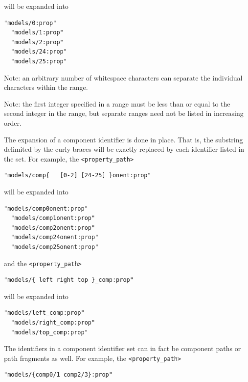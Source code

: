 \documentclass{article}
\begin{document}
will be expanded into

\begin{lstlisting}[]
  "models/0:prop"
  "models/1:prop"
  "models/2:prop"
  "models/24:prop"
  "models/25:prop"
\end{lstlisting}

\begin{sideblock}
Note: an arbitrary number of whitespace characters can separate the individual characters within the range.
\end{sideblock}

\begin{sideblock}
Note: the first integer specified in a range must be less than or equal to the second integer in the range, but separate ranges need not be listed in increasing order.
\end{sideblock}

The expansion of a component identifier is done in place. That is, the substring delimited by the curly braces will be exactly replaced by each identifier listed in the set. For example, the {\tt <property\_path>}

\begin{lstlisting}[]
  "models/comp{   [0-2] [24-25] }onent:prop"
\end{lstlisting}

will be expanded into

\begin{lstlisting}[]
  "models/comp0onent:prop"
  "models/comp1onent:prop"
  "models/comp2onent:prop"
  "models/comp24onent:prop"
  "models/comp25onent:prop"
\end{lstlisting}

and the {\tt <property\_path>}

\begin{lstlisting}[]
  "models/{ left right top }_comp:prop"
\end{lstlisting}

will be expanded into

\begin{lstlisting}[]
  "models/left_comp:prop"
  "models/right_comp:prop"
  "models/top_comp:prop"
\end{lstlisting}

The identifiers in a component identifier set can in fact be component paths or path fragments as well. For example, the {\tt <property\_path>}

\begin{lstlisting}[]
  "models/{comp0/1 comp2/3}:prop"
\end{lstlisting}
\end{document}
